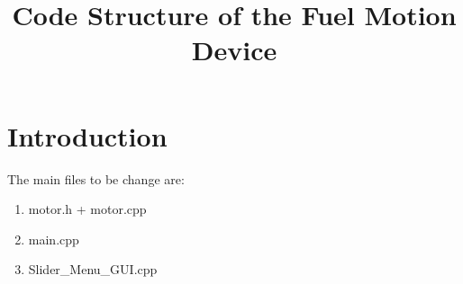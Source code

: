 \documentclass[review,number,sort&compress]{elsarticle}
\begin{document}
\begin{frontmatter}



\title{Code Structure of the Fuel Motion Device}





\end{frontmatter}

\ifDRAFT
\linenumbers
\fi

\section{Introduction}
The main files to be change are:
\begin{enumerate}
\item motor.h + motor.cpp
\item main.cpp
\item Slider\_Menu\_GUI.cpp
\end{enumerate}
\end{document}
